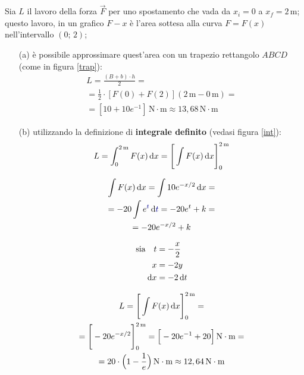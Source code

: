 Sia $L$ il lavoro della forza $\vec{F}$ per uno spostamento che vada da $x_i=0$ a $x_f=2\,\text{m}$; questo lavoro, in un grafico $F-x$ è l'area sottesa alla curva $F=F(x)$ nell'intervallo $(0;\,2)$;
\begin{itemize}
\item[(a)] \label{L:a} è possibile approssimare quest'area con un trapezio rettangolo $ABCD$ (come in figura \ref{trap}):
\begin{multline*}
L=\frac{(B+b)\cdot h}{2}=\\=\frac{1}{2}\cdot [F(0)+F(2)](2\,\text{m}-0\,\text{m})=\\=[10+10e^{-1}]\,\text{N}\cdot\text{m}\approx 13,68\,\text{N}\cdot\text{m}
\end{multline*}
\item [(b)] \label{L:b} utilizzando la definizione di \textbf{integrale definito} (vedasi figura \ref{int}):
\[
L=\int_{0}^{2\,\text{m}}F(x)\dif x=\Bigg[\int F(x) \dif x\Bigg]^{2\,\text{m}}_{0}
\]

\begin{minipage}{\textwidth}
\begin{tcolorbox}[colframe=blue!0!, colback=blue!3!, top=0mm, bottom=0mm]
\begin{multicols}{2}
\begin{gather*}
\int F(x) \dif x=\int 10e^{-x/2}\dif x=\\
=-20\int e^{\textcolor{blue}{t}}\dif \textcolor{blue}{t}=-20e^t+k=\\
=-20e^{-x/2}+k
\end{gather*}
\columnbreak

\begin{align*}
\text{sia}\quad t&=-\frac{x}{2}\\
x&=-2y\\
\dif x &= -2\dif t
\end{align*}
\end{multicols}
\end{tcolorbox}
\end{minipage}
\begin{multline*}
L=\Bigg[\int F(x) \dif x\Bigg]^{2\,\text{m}}_{0}=\\
=\Bigg[-20e^{-x/2}\Bigg]^{2\,\text{m}}_{0}=\Big[-20e^{-1}+20\Big]\,\text{N}\cdot\text{m}=\\
=20\cdot\Big(1-\frac{1}{e}\Big)\,\text{N}\cdot\text{m}\approx 12,64\,\text{N}\cdot\text{m}
\end{multline*}
\end{itemize}

